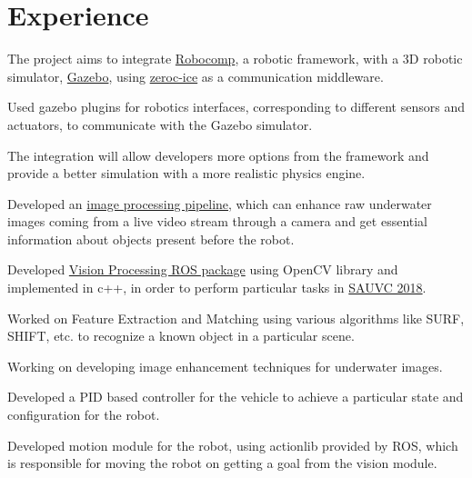 \documentclass[]{deedy-resume-openfont}
\begin{document}
\begin{minipage}[t]{0.66\textwidth} 


\section{Experience}

\vspace{\topsep} %
\begin{tightemize}
\item The project aims to integrate \href{https://robocomp.github.io/web/}{Robocomp}, a robotic framework, with a 3D robotic simulator, \href{http://gazebosim.org}{Gazebo}, using \href{https://doc.zeroc.com/ice/3.6/}{zeroc-ice} as a communication middleware.
\item Used gazebo plugins for robotics interfaces, corresponding to different sensors and actuators, to communicate with the Gazebo simulator.
\item The integration will allow developers more options from the framework and provide a better simulation with a more realistic physics engine.
\end{tightemize}
\sectionsep

\begin{tightemize}
\item Developed an \href{https://github.com/ksakash/auv2017-1/blob/IP/task_handler_layer/ip.md}{image processing pipeline}, which can enhance raw underwater images coming from a live video stream through a camera and get essential information about objects present before the robot. 
\item Developed \href{https://github.com/ksakash/IP_SAUVC/}{Vision Processing ROS package} using OpenCV library and implemented in c++, in order to perform particular tasks in \href{https://sauvc.org/}{SAUVC 2018}.  
\item Worked on Feature Extraction and Matching using various algorithms like SURF, SHIFT, etc. to recognize a known object in a particular scene.
\item Working on developing image enhancement techniques for underwater images.
\item Developed a PID based controller for the vehicle to achieve a particular state and configuration for the robot.
\item Developed motion module for the robot, using actionlib provided by ROS, which is responsible for moving the robot on getting a goal from the vision module.
\end{tightemize}
\sectionsep


\end{minipage}
\end{document}

